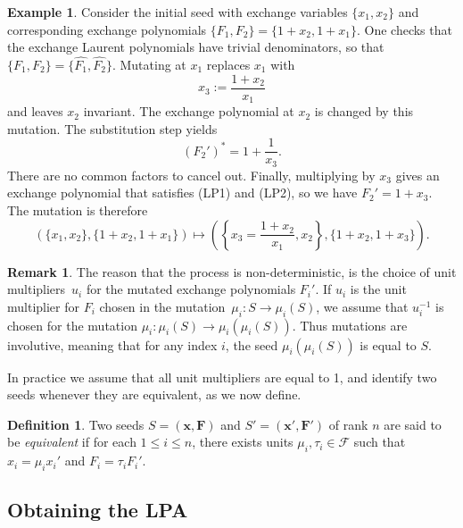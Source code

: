 \documentclass[pdftex]{sigma}
\numberwithin{equation}{section}
\theoremstyle{definition}
\newtheorem{defn}[thm]{Definition}
\newtheorem{eg}[thm]{Example}
\newtheorem{rmk}[thm]{Remark}
\begin{document}
 \begin{eg} \label{eg:mutation}
	Consider the initial seed with exchange variables $\{x_1, x_2\}$ and corresponding exchange polynomials $\{F_1, F_2\} = \{1 + x_2, 1 + x_1\}$. One checks that the exchange Laurent polynomials have trivial denominators, so that $\{F_1, F_2\} = \big\{\hat{F_1}, \hat{F_2}\big\}$. Mutating at $x_1$ replaces $x_1$ with
	\[
	x_3 := \frac{1+x_2}{x_1}
	\]
	and leaves $x_2$ invariant. The exchange polynomial at $x_2$ is changed by this mutation. The substitution step yields
	\[
	(F_2')^* = 1 + \frac{1}{x_3}.
	\]
	There are no common factors to cancel out. Finally, multiplying by $x_3$ gives an exchange polynomial that satisfies (LP1) and (LP2), so we have $F_2' = 1 + x_3$. The mutation is therefore
	\[
	( \{x_1, x_2\}, \{1 + x_2, 1 + x_1\} ) \mapsto \left( \left\{x_3 = \frac{1 + x_2}{x_1}, x_2\right\}, \{1 + x_2, 1 + x_3\} \right).
	\]
\end{eg}

\begin{rmk}\label{rmk!non-det}
The reason that the process is non-deterministic, is the choice of unit multipliers~$u_i$ for the mutated exchange polynomials $F_i'$. If $u_i$ is the unit multiplier for $F_i$ chosen in the mutation~${\mu_i\colon S\to \mu_i(S)}$, we assume that $u_i^{-1}$ is chosen for the mutation $\mu_i\colon \mu_i(S)\to \mu_i(\mu_i(S))$. Thus mutations are involutive, meaning that for any index $i$, the seed $\mu_i(\mu_i(S))$ is equal to $S$.

In practice we assume that all unit multipliers are equal to 1, and identify two seeds whenever they are equivalent, as we now define.
\end{rmk}

\begin{defn}
	Two seeds $S = (\bm{x},\bm{F})$ and $S' = (\bm{x}',\bm{F}')$ of rank $n$ are said to be \textit{equivalent} if for each $1 \leq i \leq n$, there exists units $\mu_i, \tau_i \in \mathcal{F}$ such that $x_i = \mu_i x_i'$ and $F_i = \tau_i F_i'$.
\end{defn}

\subsection{Obtaining the LPA}
\end{document}
